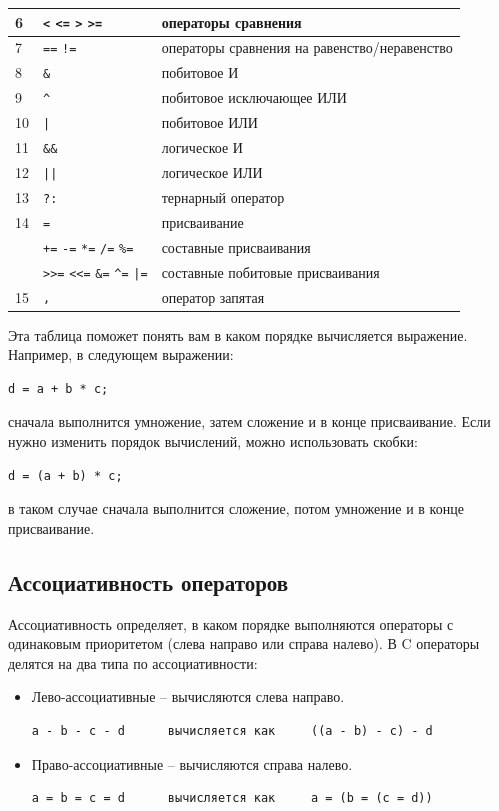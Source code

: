 \documentclass{article}
\begin{document}
\begin{center}
{\begin{tabular}{ l | l | l}
 6				    & \texttt{<} \texttt{<=} \texttt{>} \texttt{>=} & операторы сравнения \\ \hline  
 7				    & \texttt{==} \texttt{!=} 		 	& операторы сравнения на равенство/неравенство \\ \hline  
 8				    & \texttt{\&}  		 				& побитовое И \\ \hline  
 9				    & \texttt{\^{}}  		 			& побитовое исключающее ИЛИ \\ \hline  
 10				    & \texttt{|}  		 				& побитовое ИЛИ \\ \hline  
 11				    & \texttt{\&\&}  		 			& логическое И \\ \hline  
 12				    & \texttt{||}  		 				& логическое ИЛИ \\ \hline  
 13				    & \texttt{?:}  		 				& тернарный оператор \\ \hline 
 14				    & \texttt{=}  		 				& присваивание \\
  				    & \texttt{+=} \texttt{-=} \texttt{*=} \texttt{/=} \texttt{\%=}  & составные присваивания \\
  				    & \texttt{>{}>=} \texttt{<{}<=} \texttt{\&=} \texttt{\^{}=} \texttt{|=}  & составные побитовые присваивания \\\hline  
 15				    & \texttt{,}  		 				& оператор запятая
\end{tabular} 
}
\end{center}
Эта таблица поможет понять вам в каком порядке вычисляется выражение. Например, в следующем выражении:
\begin{lstlisting}
d = a + b * c;
\end{lstlisting}
сначала выполнится умножение, затем сложение и в конце присваивание. Если нужно изменить порядок вычислений, можно использовать скобки:
\begin{lstlisting}
d = (a + b) * c;
\end{lstlisting}
в таком случае сначала выполнится сложение, потом умножение и в конце присваивание.

\subsection*{Ассоциативность операторов}
Ассоциативность определяет, в каком порядке выполняются операторы с одинаковым приоритетом (слева направо или справа налево).
В C операторы делятся на два типа по ассоциативности:
\begin{itemize}
\item Лево-ассоциативные -- вычисляются слева направо.
\begin{lstlisting}
a - b - c - d      вычисляется как     ((a - b) - c) - d 
\end{lstlisting}
\item Право-ассоциативные -- вычисляются справа налево.
\begin{lstlisting}
a = b = c = d      вычисляется как     a = (b = (c = d))
\end{lstlisting}
\end{itemize}
\end{document}
